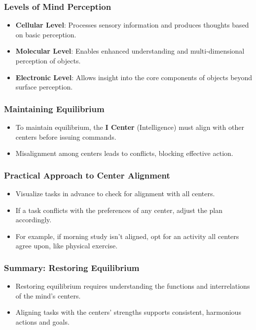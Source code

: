 \begin{frame}[fragile]\frametitle{Levels of Mind Perception}
    \begin{itemize}
        \item \textbf{Cellular Level}: Processes sensory information and produces thoughts based on basic perception.
        \item \textbf{Molecular Level}: Enables enhanced understanding and multi-dimensional perception of objects.
        \item \textbf{Electronic Level}: Allows insight into the core components of objects beyond surface perception.
    \end{itemize}
\end{frame}

\begin{frame}[fragile]\frametitle{Maintaining Equilibrium}
    \begin{itemize}
        \item To maintain equilibrium, the \textbf{I Center} (Intelligence) must align with other centers before issuing commands.
        \item Misalignment among centers leads to conflicts, blocking effective action.
    \end{itemize}
\end{frame}

\begin{frame}[fragile]\frametitle{Practical Approach to Center Alignment}
    \begin{itemize}
        \item Visualize tasks in advance to check for alignment with all centers.
        \item If a task conflicts with the preferences of any center, adjust the plan accordingly.
        \item For example, if morning study isn’t aligned, opt for an activity all centers agree upon, like physical exercise.
    \end{itemize}
\end{frame}

\begin{frame}[fragile]\frametitle{Summary: Restoring Equilibrium}
    \begin{itemize}
        \item Restoring equilibrium requires understanding the functions and interrelations of the mind’s centers.
        \item Aligning tasks with the centers’ strengths supports consistent, harmonious actions and goals.
    \end{itemize}
\end{frame}


